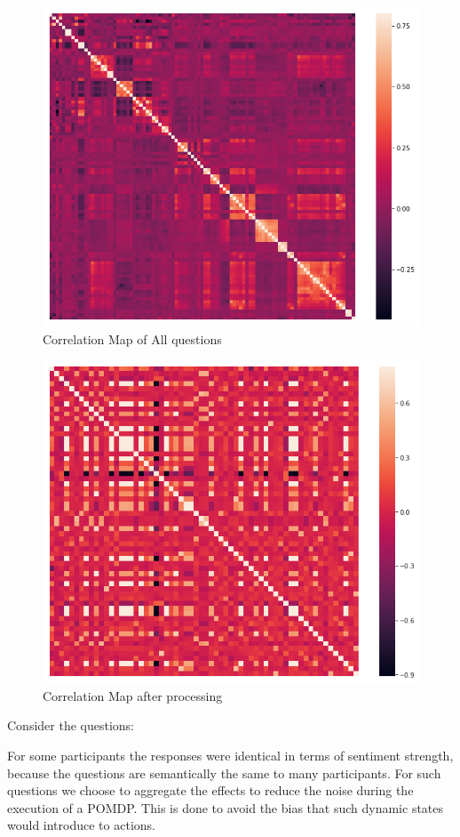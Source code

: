{\begin{figure}[H]
	\centering
	\includegraphics[width=0.7\linewidth]{Images/corrmap_all}
	\caption{Correlation Map of All questions}
	\label{fig:corrmapall}
\end{figure}

\begin{figure}[H]
	\centering
	\includegraphics[width=0.7\linewidth]{Images/cormap_processed.png}
	\caption{Correlation Map after processing}
	\label{fig:cormapprocess}
\end{figure}


Consider the questions: 





For some participants the responses were identical in terms of sentiment strength, because the questions are semantically the same to many participants. For such questions we choose to aggregate the effects to reduce the noise during the execution of a POMDP. This is done to avoid the bias that such dynamic states would introduce to actions. 

}
